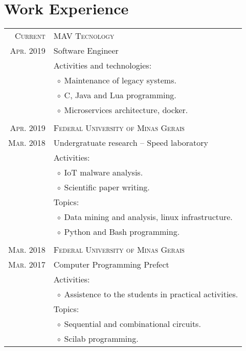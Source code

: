 \documentclass[a4paper,10pt]{article}
\newcommand{\tabitem}{$\;\circ\;$}
\newcommand{\cpp}{C\protect\scalebox{0.8}{\protect\raisebox{0.4ex}{++}}}
\renewcommand\#{\protect\scalebox{0.8}{\protect\raisebox{0.4ex}{\char"0023}}}
\begin{document}
\section{Work Experience}
\begin{tabular}{r|p{12.3cm}}
  \textsc{Current} & \textsc{MAV Tecnology} \\
  \textsc{Apr. 2019} & Software Engineer \\[5pt]
  & Activities and technologies: \\
  & \tabitem Maintenance of legacy systems. \\
  & \tabitem \cpp, Java and Lua programming. \\
  & \tabitem Microservices architecture, docker. \\

  \multicolumn{2}{c}{} \\
  \textsc{Apr. 2019} & \textsc{Federal University of Minas Gerais} \\
  \textsc{Mar. 2018} & Undergratuate research -- Speed laboratory \\[5pt]
  & Activities: \\
  & \tabitem IoT malware analysis. \\
  & \tabitem Scientific paper writing. \\
  & Topics: \\
  & \tabitem Data mining and analysis, linux infrastructure. \\
  & \tabitem Python and Bash programming. \\

  \multicolumn{2}{c}{} \\
  \textsc{Mar. 2018} & \textsc{Federal University of Minas Gerais} \\
  \textsc{Mar. 2017} & Computer Programming Prefect \\[5pt]
  & Activities: \\
  & \tabitem Assistence to the students in practical activities. \\
  & Topics: \\
  & \tabitem Sequential and combinational circuits. \\
  & \tabitem Scilab programming. \\
  

\end{tabular}
\end{document}
